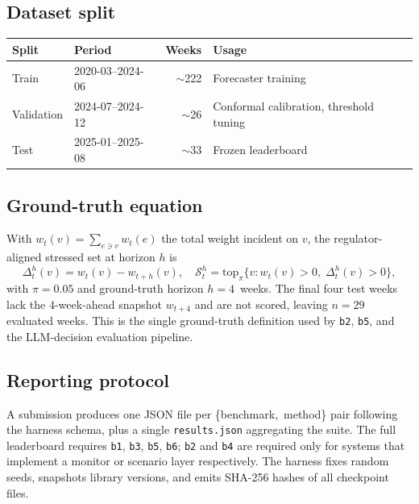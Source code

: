 \subsection{Dataset split}
\begin{center}\small
\begin{tabularx}{\linewidth}{@{}llrX@{}}
\toprule
Split      & Period             & Weeks       & Usage \\
\midrule
Train      & 2020-03--2024-06   & $\sim$222   & Forecaster training \\
Validation & 2024-07--2024-12   & $\sim$26    & Conformal calibration, threshold tuning \\
Test       & 2025-01--2025-08   & $\sim$33    & Frozen leaderboard \\
\bottomrule
\end{tabularx}
\end{center}

\subsection{Ground-truth equation}
With $w_t(v)\!=\!\sum_{e\ni v}w_t(e)$ the total weight incident on
$v$, the regulator-aligned stressed set at horizon $h$ is
\begin{equation}
\Delta_t^h(v)\!=\!w_t(v)\!-\!w_{t+h}(v),\quad
\mathcal{S}_t^h \!=\! \mathrm{top}_{\pi}\bigl\{ v : w_t(v)\!>\!0,\;
                                              \Delta_t^h(v)\!>\!0 \bigr\},
\label{eq:stressed-app}
\end{equation}
with $\pi\!=\!0.05$ and ground-truth horizon $h\!=\!4$~weeks. The
final four test weeks lack the $4$-week-ahead snapshot $w_{t+4}$
and are not scored, leaving $n\!=\!29$ evaluated weeks. This is the
single ground-truth definition used by \texttt{b2}, \texttt{b5}, and
the LLM-decision evaluation pipeline.

\subsection{Reporting protocol}
A submission produces one JSON file per
\{benchmark,~method\} pair following the harness schema, plus a
single \texttt{results.json} aggregating the suite. The full
leaderboard requires \texttt{b1}, \texttt{b3}, \texttt{b5},
\texttt{b6}; \texttt{b2} and \texttt{b4} are required only for
systems that implement a monitor or scenario layer respectively. The
harness fixes random seeds, snapshots library versions, and emits
SHA-256 hashes of all checkpoint files.
